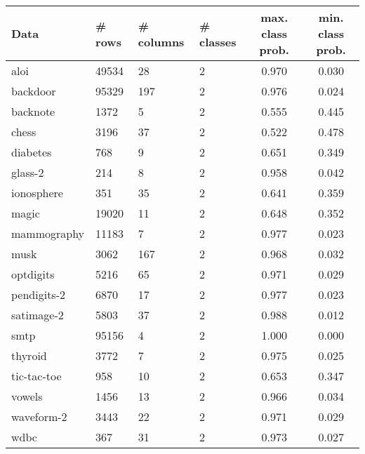 \begin{table}[ht]
\centering
\begin{tabular}{|l|ll|l|cc|}
  \hline
Data & \# rows & \# columns & \# classes & max. class prob. & min. class prob. \\ 
  \hline
aloi & 49534 &   28 &    2 & 0.970 & 0.030 \\ 
  backdoor & 95329 &  197 &    2 & 0.976 & 0.024 \\ 
  backnote & 1372 &    5 &    2 & 0.555 & 0.445 \\ 
  chess & 3196 &   37 &    2 & 0.522 & 0.478 \\ 
  diabetes &  768 &    9 &    2 & 0.651 & 0.349 \\ 
  glass-2 &  214 &    8 &    2 & 0.958 & 0.042 \\ 
  ionosphere &  351 &   35 &    2 & 0.641 & 0.359 \\ 
  magic & 19020 &   11 &    2 & 0.648 & 0.352 \\ 
  mammography & 11183 &    7 &    2 & 0.977 & 0.023 \\ 
  musk & 3062 &  167 &    2 & 0.968 & 0.032 \\ 
  optdigits & 5216 &   65 &    2 & 0.971 & 0.029 \\ 
  pendigits-2 & 6870 &   17 &    2 & 0.977 & 0.023 \\ 
  satimage-2 & 5803 &   37 &    2 & 0.988 & 0.012 \\ 
  smtp & 95156 &    4 &    2 & 1.000 & 0.000 \\ 
  thyroid & 3772 &    7 &    2 & 0.975 & 0.025 \\ 
  tic-tac-toe &  958 &   10 &    2 & 0.653 & 0.347 \\ 
  vowels & 1456 &   13 &    2 & 0.966 & 0.034 \\ 
  waveform-2 & 3443 &   22 &    2 & 0.971 & 0.029 \\ 
  wdbc &  367 &   31 &    2 & 0.973 & 0.027 \\ 
  \hline
  

\end{tabular}
\end{table}
